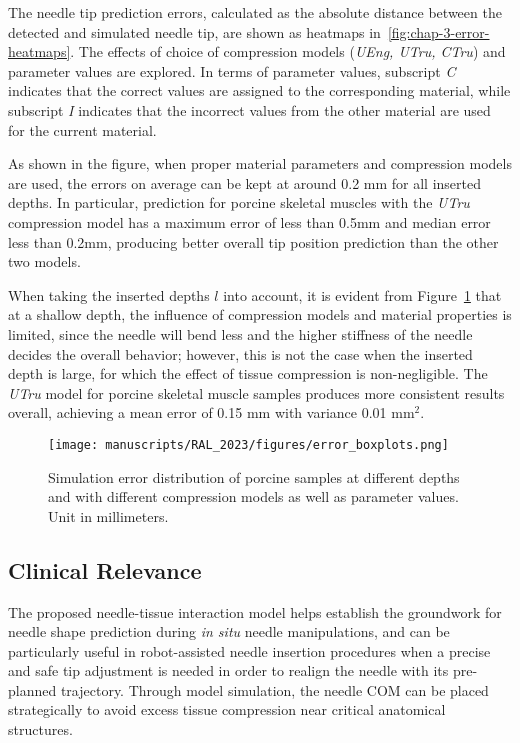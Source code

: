 The needle tip prediction errors, calculated as the absolute distance between the detected and simulated needle tip, are shown as heatmaps in~\cref{fig:chap-3-error-heatmaps}. The effects of choice of compression models (\textit{UEng, UTru, CTru}) and parameter values are explored. In terms of parameter values, subscript \textit{C} indicates that the correct values are assigned to the corresponding material, while subscript \textit{I} indicates that the incorrect values from the other material are used for the current material.

As shown in the figure, when proper material parameters and compression models are used, the errors on average can be kept at around 0.2 mm for all inserted depths. In particular, prediction for porcine skeletal muscles with the \textit{UTru} compression model has a maximum error of less than 0.5mm and median error less than 0.2mm, producing better overall tip position prediction than the other two models.

When taking the inserted depths $l$ into account, it is evident from Figure~\ref{fig:chap-3-error-boxplots} that at a shallow depth, the influence of compression models and material properties is limited, since the needle will bend less and the higher stiffness of the needle decides the overall behavior; however, this is not the case when the inserted depth is large, for which the effect of tissue compression is non-negligible. The \textit{UTru} model for porcine skeletal muscle samples produces more consistent results overall, achieving a mean error of 0.15 mm with variance 0.01 mm$^2$.

\begin{figure}[t]
   \centering
   \texttt{[image: manuscripts/RAL\_2023/figures/error\_boxplots.png]}
   \caption{Simulation error distribution of porcine samples at different depths and with different compression models as well as parameter values. Unit in millimeters.}
   \label{fig:chap-3-error-boxplots}
 \end{figure}

\subsection{Clinical Relevance}
\label{sec:clinical_relevance}

The proposed needle-tissue interaction model helps establish the groundwork for needle shape prediction during \textit{in situ} needle manipulations, and can be particularly useful in robot-assisted needle insertion procedures when a precise and safe tip adjustment is needed in order to realign the needle with its pre-planned trajectory. Through model simulation, the needle COM can be placed strategically to avoid excess tissue compression near critical anatomical structures.

